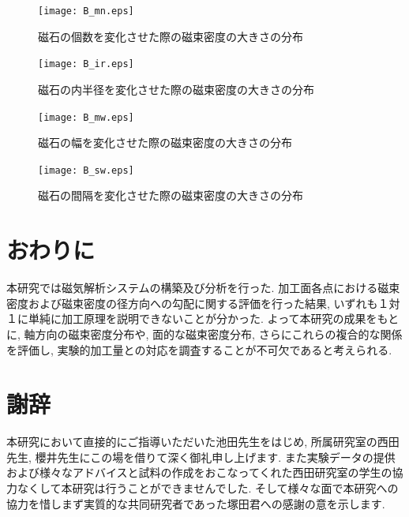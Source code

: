 \documentclass[11pt]{jarticle}
\begin{document}
  \begin{figure}[H]
    \begin{center}
      \texttt{[image: B\_mn.eps]}
    \end{center}
    \caption{磁石の個数を変化させた際の磁束密度の大きさの分布}
    \label{fig:B_mn}
  \end{figure}

  \begin{figure}[H]
    \begin{center}
      \texttt{[image: B\_ir.eps]}
    \end{center}
    \caption{磁石の内半径を変化させた際の磁束密度の大きさの分布}
    \label{fig:B_ir}
  \end{figure}

  \begin{figure}[H]
    \begin{center}
      \texttt{[image: B\_mw.eps]}
    \end{center}
    \caption{磁石の幅を変化させた際の磁束密度の大きさの分布}
    \label{fig:B_mw}
  \end{figure}

  \begin{figure}[H]
    \begin{center}
      \texttt{[image: B\_sw.eps]}
    \end{center}
    \caption{磁石の間隔を変化させた際の磁束密度の大きさの分布}
    \label{fig:B_sw}
  \end{figure}

\newpage 

  \section{おわりに}
本研究では磁気解析システムの構築及び分析を行った. 
加工面各点における磁束密度および磁束密度の径方向への勾配に関する評価を行った結果, いずれも１対１に単純に加工原理を説明できないことが分かった. よって本研究の成果をもとに, 軸方向の磁束密度分布や, 面的な磁束密度分布, さらにこれらの複合的な関係を評価し, 実験的加工量との対応を調査することが不可欠であると考えられる. 


  \section*{謝辞}
本研究において直接的にご指導いただいた池田先生をはじめ, 所属研究室の西田先生, 櫻井先生にこの場を借りて深く御礼申し上げます. また実験データの提供および様々なアドバイスと試料の作成をおこなってくれた西田研究室の学生の協力なくして本研究は行うことができませんでした. そして様々な面で本研究への協力を惜しまず実質的な共同研究者であった塚田君への感謝の意を示します. 
\end{document}
